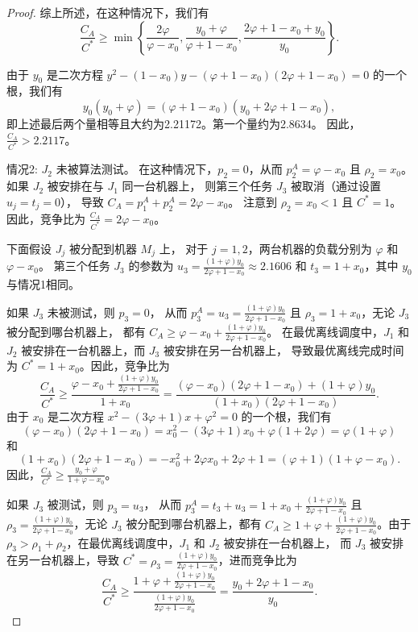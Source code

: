 \begin{proof}
综上所述，在这种情况下，我们有
\[
\frac{C_A}{C^*} \geq \min \left\{ \frac{2\varphi}{\varphi - x_0}, 
\frac{y_0 + \varphi}{\varphi + 1 - x_0}, 
\frac{2\varphi + 1 - x_0 + y_0}{y_0} \right\}.
\]

由于 \( y_0 \) 是二次方程 \( y^2 - (1 - x_0)y - (\varphi + 1 - x_0)(2\varphi + 1 - x_0) = 0 \) 的一个根，我们有
\[
y_0(y_0 + \varphi) = (\varphi + 1 - x_0)(y_0 + 2\varphi + 1 - x_0),
\]
即上述最后两个量相等且大约为2.21172。第一个量约为2.8634。
因此，\(\frac{C_A}{C^*} > 2.2117\)。

情况2: \( J_2 \) 未被算法测试。
在这种情况下，\( p_2 = 0 \)，从而 \( p^A_2 = \varphi - x_0 \) 且 \( \rho_2 = x_0 \)。
如果 \( J_2 \) 被安排在与 \( J_1 \) 同一台机器上，
则第三个任务 \( J_3 \) 被取消（通过设置 \( u_j = t_j = 0 \)），
导致 \( C_A = p^A_1 + p^A_2 = 2\varphi - x_0 \)。
注意到 \( \rho_2 = x_0 < 1 \) 且 \( C^* = 1 \)。
因此，竞争比为 \( \frac{C_A}{C^*} = 2\varphi - x_0 \)。

下面假设 \( J_j \) 被分配到机器 \( M_j \) 上，
对于 \( j = 1, 2 \)，两台机器的负载分别为 \( \varphi \) 和 \( \varphi - x_0 \)。
第三个任务 \( J_3 \) 的参数为 \( u_3 = \frac{(1+\varphi)y_0}{2\varphi+1-x_0} \approx 2.1606 \) 和 \( t_3 = 1 + x_0 \)，其中 \( y_0 \) 与情况1相同。

如果 \( J_3 \) 未被测试，则 \( p_3 = 0 \)，
从而 \( p^A_3 = u_3 = \frac{(1+\varphi)y_0}{2\varphi+1-x_0} \) 且 \( \rho_3 = 1 + x_0 \)，无论 \( J_3 \) 被分配到哪台机器上，
都有 \( C_A \geq \varphi - x_0 + \frac{(1+\varphi)y_0}{2\varphi+1-x_0} \)。
在最优离线调度中，\( J_1 \) 和 \( J_2 \) 被安排在一台机器上，而 \( J_3 \) 被安排在另一台机器上，
导致最优离线完成时间为 \( C^* = 1 + x_0 \)。因此，竞争比为
\[
\frac{C_A}{C^*} \geq \frac{\varphi - x_0 + \frac{(1+\varphi)y_0}{2\varphi+1-x_0}}{1 + x_0} = \frac{(\varphi - x_0)(2\varphi + 1 - x_0) + (1 + \varphi)y_0}{(1 + x_0)(2\varphi + 1 - x_0)}.
\]
由于 \( x_0 \) 是二次方程 \( x^2 - (3\varphi + 1)x + \varphi^2 = 0 \) 的一个根，我们有
\[
(\varphi - x_0)(2\varphi + 1 - x_0) = x_0^2 - (3\varphi + 1)x_0 + \varphi(1 + 2\varphi) = \varphi(1 + \varphi)
\]
和
\[
(1 + x_0)(2\varphi + 1 - x_0) = -x_0^2 + 2\varphi x_0 + 2\varphi + 1 = (\varphi + 1)(1 + \varphi - x_0).
\]
因此，\(\frac{C_A}{C^*} \geq \frac{y_0 + \varphi}{1 + \varphi - x_0}\)。

如果 \( J_3 \) 被测试，则 \( p_3 = u_3 \)，
从而 \( p^A_3 = t_3 + u_3 = 1 + x_0 + \frac{(1+\varphi)y_0}{2\varphi+1-x_0} \) 且 \( \rho_3 = \frac{(1+\varphi)y_0}{2\varphi+1-x_0} \)，无论 \( J_3 \) 被分配到哪台机器上，都有 \( C_A \geq 1 + \varphi + \frac{(1+\varphi)y_0}{2\varphi+1-x_0} \)。由于 \( \rho_3 > \rho_1 + \rho_2 \)，在最优离线调度中，\( J_1 \) 和 \( J_2 \) 被安排在一台机器上，
而 \( J_3 \) 被安排在另一台机器上，导致 \( C^* = \rho_3 = \frac{(1+\varphi)y_0}{2\varphi+1-x_0} \)，进而竞争比为
\[
\frac{C_A}{C^*} \geq \frac{1 + \varphi + \frac{(1+\varphi)y_0}{2\varphi+1-x_0}}{\frac{(1+\varphi)y_0}{2\varphi+1-x_0}} = \frac{y_0 + 2\varphi + 1 - x_0}{y_0}.
\]


\end{proof}
